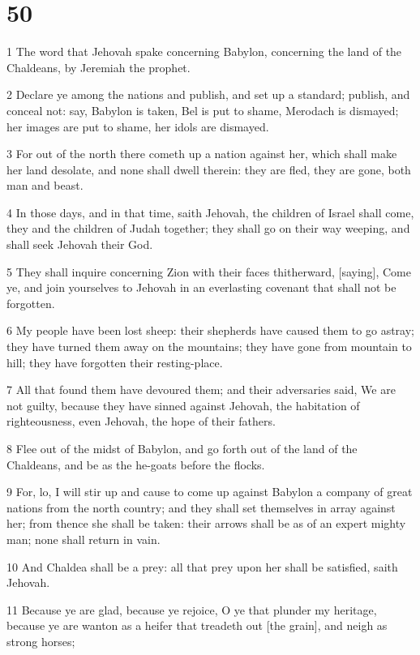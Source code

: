 \chapter{50}

\par 1 The word that Jehovah spake concerning Babylon, concerning the land of the Chaldeans, by Jeremiah the prophet.
\par 2 Declare ye among the nations and publish, and set up a standard; publish, and conceal not: say, Babylon is taken, Bel is put to shame, Merodach is dismayed; her images are put to shame, her idols are dismayed.
\par 3 For out of the north there cometh up a nation against her, which shall make her land desolate, and none shall dwell therein: they are fled, they are gone, both man and beast.
\par 4 In those days, and in that time, saith Jehovah, the children of Israel shall come, they and the children of Judah together; they shall go on their way weeping, and shall seek Jehovah their God.
\par 5 They shall inquire concerning Zion with their faces thitherward, [saying], Come ye, and join yourselves to Jehovah in an everlasting covenant that shall not be forgotten.
\par 6 My people have been lost sheep: their shepherds have caused them to go astray; they have turned them away on the mountains; they have gone from mountain to hill; they have forgotten their resting-place.
\par 7 All that found them have devoured them; and their adversaries said, We are not guilty, because they have sinned against Jehovah, the habitation of righteousness, even Jehovah, the hope of their fathers.
\par 8 Flee out of the midst of Babylon, and go forth out of the land of the Chaldeans, and be as the he-goats before the flocks.
\par 9 For, lo, I will stir up and cause to come up against Babylon a company of great nations from the north country; and they shall set themselves in array against her; from thence she shall be taken: their arrows shall be as of an expert mighty man; none shall return in vain.
\par 10 And Chaldea shall be a prey: all that prey upon her shall be satisfied, saith Jehovah.
\par 11 Because ye are glad, because ye rejoice, O ye that plunder my heritage, because ye are wanton as a heifer that treadeth out [the grain], and neigh as strong horses;
